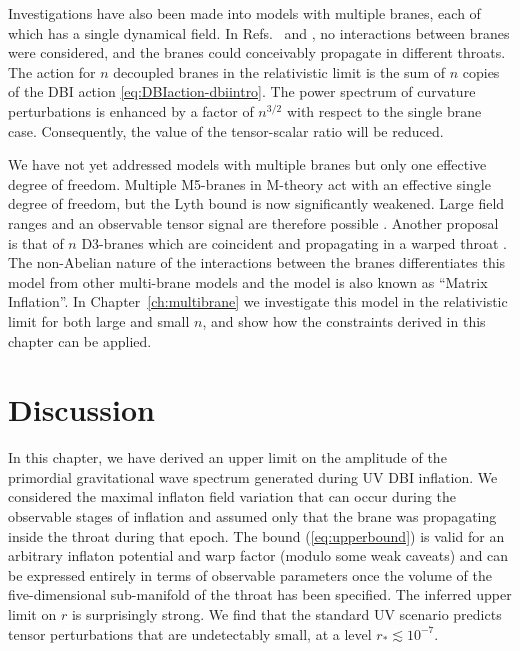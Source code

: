 Investigations have also been made into models with multiple branes, each of which
has a single dynamical field. In Refs.~\cite{Cai:2008if} and \cite{Cai:2009hw}, no
interactions between branes were considered, and the branes could conceivably propagate in different
throats. The action for $n$ decoupled branes in the
relativistic limit is the sum of $n$ copies of the DBI action
\eqref{eq:DBIaction-dbiintro}. The power spectrum of curvature perturbations is
enhanced by a factor of $n^{3/2}$ with respect to the single brane case. Consequently, the value
of the tensor-scalar ratio will be reduced. 


We have not yet addressed models with multiple branes but only one effective
degree of freedom. Multiple M5-branes in M-theory act with an effective
single degree of freedom, but the Lyth bound is now significantly weakened. Large
field ranges and an observable tensor signal are therefore possible \cite{Krause:2007jr}. 
Another proposal is that of $n$ D3-branes which are coincident and propagating in a
warped throat \cite{thomasward, hltw, Ward:2007gs, Berndsen:2009ww}. The
non-Abelian nature of the interactions between the branes differentiates this model
from other multi-brane models and the model is also known as ``Matrix Inflation''.
In Chapter~\ref{ch:multibrane} we
investigate this model in the relativistic limit
for both large and small $n$, and show how the constraints derived in this
chapter can be applied.


% 
% 
% 
\section{Discussion}
\label{sec:conclusion-dbi}

In this chapter, we have derived an upper limit on
the amplitude of the primordial gravitational wave spectrum
generated during UV DBI inflation. We considered   
the maximal inflaton field variation   
that can occur during the observable stages of inflation and assumed  
only that the brane was propagating inside the throat during that epoch. 
The bound (\ref{eq:upperbound}) is valid for an arbitrary inflaton potential and 
warp factor (modulo some weak caveats) and can be expressed 
entirely in terms of observable parameters once the volume of 
the five-dimensional sub-manifold of the throat has been specified. 
The inferred upper limit on $r$ is surprisingly strong. 
We find that the standard UV  
scenario predicts tensor perturbations that are undetectably small, 
at a level ${r_*} \lesssim {10^{-7}}$. 

